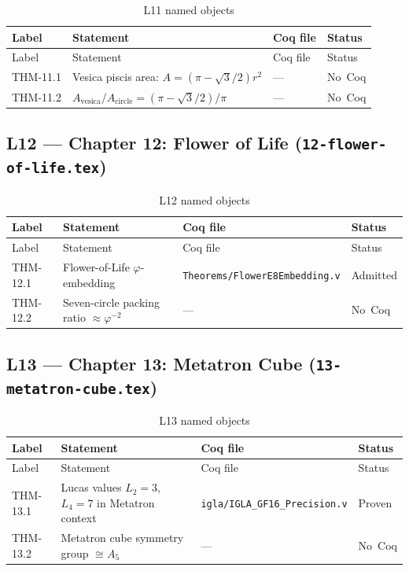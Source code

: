 \begin{longtable}{lp{6cm}ll}
\toprule
Label & Statement & Coq file & Status \\
\midrule
\endfirsthead
\toprule
Label & Statement & Coq file & Status \\
\midrule
\endhead
\bottomrule
\endfoot
\bottomrule
\caption{L11 named objects}
\endlastfoot
THM-11.1 & Vesica piscis area: $A = (\pi - \sqrt{3}/2)r^{2}$ & --- & No~Coq \\
THM-11.2 & $A_{\text{vesica}}/A_{\text{circle}}=(\pi-\sqrt{3}/2)/\pi$ & --- & No~Coq \\
\end{longtable}

\subsection{L12 — Chapter 12: Flower of Life
  (\texttt{12-flower-of-life.tex})}
\label{sec:A-L12}

\begin{longtable}{lp{6cm}ll}
\toprule
Label & Statement & Coq file & Status \\
\midrule
\endfirsthead
\toprule
Label & Statement & Coq file & Status \\
\midrule
\endhead
\bottomrule
\endfoot
\bottomrule
\caption{L12 named objects}
\endlastfoot
THM-12.1 & Flower-of-Life $\varphi$-embedding &
  \texttt{Theorems/FlowerE8Embedding.v} & Admitted \\
THM-12.2 & Seven-circle packing ratio $\approx \varphi^{-2}$ & --- & No~Coq \\
\end{longtable}

\subsection{L13 — Chapter 13: Metatron Cube
  (\texttt{13-metatron-cube.tex})}
\label{sec:A-L13}

\begin{longtable}{lp{6cm}ll}
\toprule
Label & Statement & Coq file & Status \\
\midrule
\endfirsthead
\toprule
Label & Statement & Coq file & Status \\
\midrule
\endhead
\bottomrule
\endfoot
\bottomrule
\caption{L13 named objects}
\endlastfoot
THM-13.1 & Lucas values $L_2=3$, $L_4=7$ in Metatron context &
  \texttt{igla/IGLA\_GF16\_Precision.v} & Proven \\
THM-13.2 & Metatron cube symmetry group $\cong A_5$ & --- & No~Coq \\
\end{longtable}

